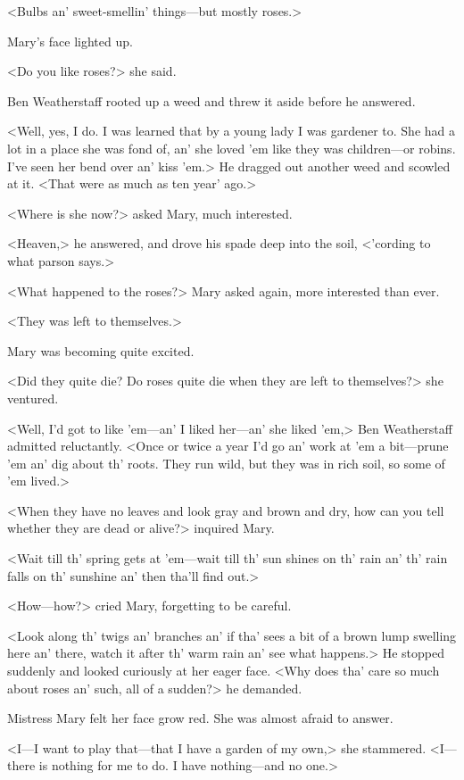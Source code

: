 <Bulbs an' sweet-smellin' things—but mostly roses.>

Mary's face lighted up.

<Do you like roses?> she said.

Ben Weatherstaff rooted up a weed and threw it aside before he answered.

<Well, yes, I do. I was learned that by a young lady I was gardener to. She had a lot in a place she was fond of, an' she loved 'em like they was children—or robins. I've seen her bend over an' kiss 'em.> He dragged out another weed and scowled at it. <That were as much as ten year' ago.>

<Where is she now?> asked Mary, much interested.

<Heaven,> he answered, and drove his spade deep into the soil, <'cording to what parson says.>

<What happened to the roses?> Mary asked again, more interested than ever.

<They was left to themselves.>

Mary was becoming quite excited.

<Did they quite die? Do roses quite die when they are left to themselves?> she ventured.

<Well, I'd got to like 'em—an' I liked her—an' she liked 'em,> Ben Weatherstaff admitted reluctantly. <Once or twice a year I'd go an' work at 'em a bit—prune 'em an' dig about th' roots. They run wild, but they was in rich soil, so some of 'em lived.>

<When they have no leaves and look gray and brown and dry, how can you tell whether they are dead or alive?> inquired Mary.

<Wait till th' spring gets at 'em—wait till th' sun shines on th' rain an' th' rain falls on th' sunshine an' then tha'll find out.>

<How—how?> cried Mary, forgetting to be careful.

<Look along th' twigs an' branches an' if tha' sees a bit of a brown lump swelling here an' there, watch it after th' warm rain an' see what happens.> He stopped suddenly and looked curiously at her eager face. <Why does tha' care so much about roses an' such, all of a sudden?> he demanded.

Mistress Mary felt her face grow red. She was almost afraid to answer.

<I—I want to play that—that I have a garden of my own,> she stammered. <I—there is nothing for me to do. I have nothing—and no one.>


